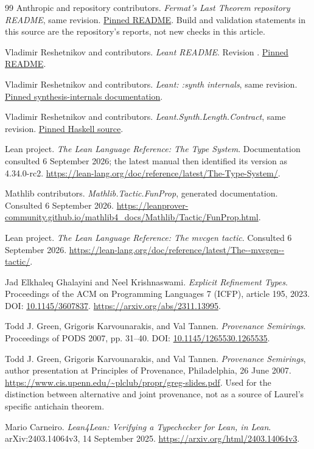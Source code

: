 \documentclass[11pt,a4paper]{article}
\newcommand{\code}[1]{\texttt{\detokenize{#1}}}
\theoremstyle{definition}
\theoremstyle{remark}
\begin{document}
\begin{thebibliography}{99}
 Anthropic and repository contributors.
\emph{Fermat's Last Theorem repository README}, same revision.
\href{https://github.com/anthropics/fermats-last-theorem/blob/aa2d8b34692b16c70f699536de0d8e75b9a3e9ef/README.md}{Pinned README}.
Build and validation statements in this source are the repository's reports, not new checks in this article.

 Vladimir Reshetnikov and contributors.
\emph{Leant README}.
Revision \code{3a40904be8a410d832d9ab6900b3d3e7b425eccb}.
\href{https://github.com/VladimirReshetnikov/Leant/blob/3a40904be8a410d832d9ab6900b3d3e7b425eccb/README.md}{Pinned README}.

 Vladimir Reshetnikov and contributors.
\emph{Leant: :synth internals}, same revision.
\href{https://github.com/VladimirReshetnikov/Leant/blob/3a40904be8a410d832d9ab6900b3d3e7b425eccb/docs/synth-internals.md}{Pinned synthesis-internals documentation}.

 Vladimir Reshetnikov and contributors.
\emph{Leant.Synth.Length.Contract}, same revision.
\href{https://github.com/VladimirReshetnikov/Leant/blob/3a40904be8a410d832d9ab6900b3d3e7b425eccb/src/Leant/Synth/Length/Contract.hs}{Pinned Haskell source}.

 Lean project.
\emph{The Lean Language Reference: The Type System}.
Documentation consulted 6 September 2026; the latest manual then identified its version as 4.34.0-rc2.
\url{https://lean-lang.org/doc/reference/latest/The-Type-System/}.

 Mathlib contributors.
\emph{Mathlib.Tactic.FunProp}, generated documentation.
Consulted 6 September 2026.
\url{https://leanprover-community.github.io/mathlib4_docs/Mathlib/Tactic/FunProp.html}.

 Lean project.
\emph{The Lean Language Reference: The mvcgen tactic}.
Consulted 6 September 2026.
\url{https://lean-lang.org/doc/reference/latest/The--mvcgen--tactic/}.

 Jad Elkhaleq Ghalayini and Neel Krishnaswami.
\emph{Explicit Refinement Types}.
Proceedings of the ACM on Programming Languages 7 (ICFP), article 195, 2023.
DOI: \href{https://doi.org/10.1145/3607837}{10.1145/3607837}.
\url{https://arxiv.org/abs/2311.13995}.

 Todd J. Green, Grigoris Karvounarakis, and Val Tannen.
\emph{Provenance Semirings}.
Proceedings of PODS 2007, pp. 31--40.
DOI: \href{https://doi.org/10.1145/1265530.1265535}{10.1145/1265530.1265535}.

 Todd J. Green, Grigoris Karvounarakis, and Val Tannen.
\emph{Provenance Semirings}, author presentation at Principles of Provenance, Philadelphia, 26 June 2007.
\url{https://www.cis.upenn.edu/~plclub/propr/greg-slides.pdf}.
Used for the distinction between alternative and joint provenance, not as a source of Laurel's specific antichain theorem.

 Mario Carneiro.
\emph{Lean4Lean: Verifying a Typechecker for Lean, in Lean}.
arXiv:2403.14064v3, 14 September 2025.
\url{https://arxiv.org/html/2403.14064v3}.
\end{thebibliography}
\end{document}
